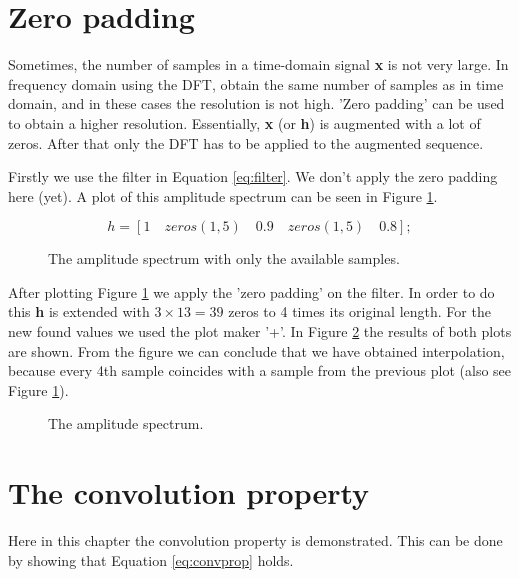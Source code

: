 \documentclass[final]{scrreprt} %
\begin{document}
\section{Zero padding}
Sometimes, the number of samples in a time-domain signal \textbf{x} is not very large. 
In frequency domain using the DFT, obtain the same number of samples as in time domain, and in these cases the resolution is not high.
'Zero padding' can be used to obtain a higher resolution.
Essentially, \textbf{x} (or \textbf{h}) is augmented with a lot of zeros.
After that only the DFT has to be applied to the augmented sequence. 

Firstly we use the filter in Equation \ref{eq:filter}. 
We don't apply the zero padding here (yet). 
A plot of this amplitude spectrum can be seen in Figure \ref{fig:zeropadding1}.

\begin{equation}
h = [1\quad zeros(1,5)\quad 0.9\quad zeros(1,5)\quad 0.8];
\label{eq:filter}
\end{equation}

\begin{figure}[H]
	\centering
	\setlength\figureheight{6cm}
  	\setlength\figurewidth{10cm}
	
	\caption{The amplitude spectrum with only the available samples.}
	\label{fig:zeropadding1}
\end{figure}

After plotting Figure \ref{fig:zeropadding1} we apply the 'zero padding' on the filter. 
In order to do this \textbf{h} is extended with $3\times 13 = 39$ zeros to 4 times its original length.
For the new found values we used the plot maker '+'.
In Figure \ref{fig:zeropadding2} the results of both plots are shown. 
From the figure we can conclude that we have obtained interpolation, because every 4th sample coincides with a sample from the previous plot (also see Figure \ref{fig:zeropadding1}).

\begin{figure}[H]
	\centering
	\setlength\figureheight{6cm}
  	\setlength\figurewidth{10cm}
	
	\caption{The amplitude spectrum.}
	\label{fig:zeropadding2}
\end{figure}


\section{The convolution property}
Here in this chapter the convolution property is demonstrated. 
This can be done by showing that Equation \ref{eq:convprop} holds.
\end{document}
